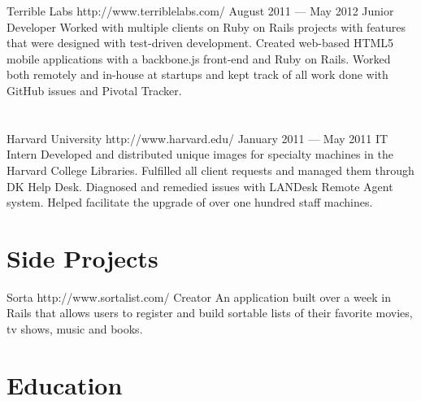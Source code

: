 \documentclass{resume}
\begin{document}
\employer
	{Terrible Labs}
	{http://www.terriblelabs.com/}
	{August 2011 --- May 2012}
	{Junior Developer}
	{Worked with multiple clients on Ruby on Rails projects with features that were designed with test-driven development. Created web-based HTML5 mobile applications with a backbone.js front-end and Ruby on Rails. Worked both remotely and in-house at startups and kept track of all work done with GitHub issues and Pivotal Tracker.}
\\ \\ \\
\employer
	{Harvard University}
	{http://www.harvard.edu/}
	{January 2011 --- May 2011}
	{IT Intern}
	{Developed and distributed unique images for specialty machines in the Harvard College Libraries. Fulfilled all client requests and managed them through DK Help Desk. Diagnosed and remedied issues with LANDesk Remote Agent system. Helped facilitate the upgrade of over one hundred staff machines.}

\section{Side Projects}

\project
	{Sorta}
	{http://www.sortalist.com/}
	{Creator}
	{An application built over a week in Rails that allows users to register and build sortable lists of their favorite movies, tv shows, music and books.}

\section{Education}

\end{document}

